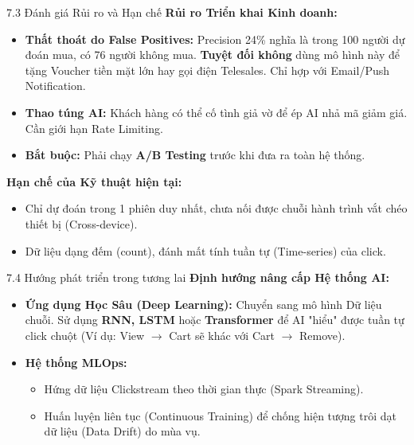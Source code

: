 \documentclass[aspectratio=169, 11pt]{beamer}
\begin{document}
\begin{frame}{7.3 Đánh giá Rủi ro và Hạn chế}
    \textbf{Rủi ro Triển khai Kinh doanh:}
    \begin{itemize}
        \item \textbf{Thất thoát do False Positives:} Precision 24\% nghĩa là trong 100 người dự đoán mua, có 76 người không mua. \textbf{Tuyệt đối không} dùng mô hình này để tặng Voucher tiền mặt lớn hay gọi điện Telesales. Chỉ hợp với Email/Push Notification.
        \item \textbf{Thao túng AI:} Khách hàng có thể cố tình giả vờ để ép AI nhả mã giảm giá. Cần giới hạn Rate Limiting.
        \item \textbf{Bắt buộc:} Phải chạy \textbf{A/B Testing} trước khi đưa ra toàn hệ thống.
    \end{itemize}

    \vspace{0.3cm}
    \textbf{Hạn chế của Kỹ thuật hiện tại:}
    \begin{itemize}
        \item Chỉ dự đoán trong 1 phiên duy nhất, chưa nối được chuỗi hành trình vắt chéo thiết bị (Cross-device).
        \item Dữ liệu dạng đếm (count), đánh mất tính tuần tự (Time-series) của click.
    \end{itemize}
\end{frame}

\begin{frame}{7.4 Hướng phát triển trong tương lai}
    \textbf{Định hướng nâng cấp Hệ thống AI:}
    \begin{itemize}
        \item \textbf{Ứng dụng Học Sâu (Deep Learning):} Chuyển sang mô hình Dữ liệu chuỗi. Sử dụng \textbf{RNN, LSTM} hoặc \textbf{Transformer} để AI "hiểu" được tuần tự click chuột (Ví dụ: View $\rightarrow$ Cart sẽ khác với Cart $\rightarrow$ Remove).
        \item \textbf{Hệ thống MLOps:} 
        \begin{itemize}
            \item Hứng dữ liệu Clickstream theo thời gian thực (Spark Streaming).
            \item Huấn luyện liên tục (Continuous Training) để chống hiện tượng trôi dạt dữ liệu (Data Drift) do mùa vụ.
        \end{itemize}
    \end{itemize}
\end{frame}
\end{document}
